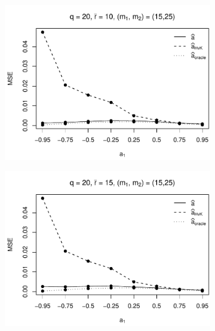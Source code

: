 \begin{figure}[p]
\begin{subfigure}[b]{0.45\textwidth}
\includegraphics[width=\textwidth]{Plots/Robustness/MSE_a1_T=500_slope=10_(q,r,M1,M2)=(20,10,15,25).pdf}
\end{subfigure}
\hspace{0.25cm}
\begin{subfigure}[b]{0.45\textwidth}
\includegraphics[width=\textwidth]{Plots/Robustness/MSE_a1_T=500_slope=10_(q,r,M1,M2)=(20,15,15,25).pdf}
\end{subfigure}


\end{figure}
